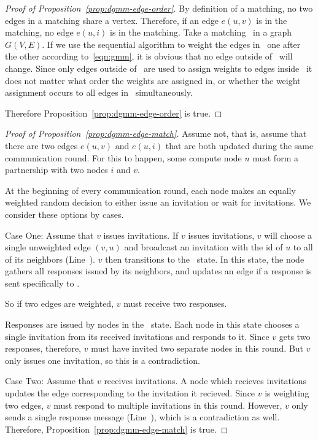   \begin{proof}[Proof of Proposition~\ref{prop:dgmm-edge-order}]
    By definition of a matching, no two edges in a matching share a vertex. Therefore, if an edge $e(u,v)$ is in the matching, no edge $e(u,i)$ is in the matching. 
    Take a matching \bMd\ in a graph $G(V,E)$. If we use the sequential algorithm to weight the edges in \bMd\ one after the other according to~\eqref{eqn:gmm}, it is obvious that no edge outside of \bMd\ will change. Since only edges outside of \bMd\ are used to assign weights to edges inside \bMd\, it does not matter what order the weights are assigned in, or whether the weight assignment occurs to all edges in \bMd\ simultaneously.
    
    Therefore Proposition~\ref{prop:dgmm-edge-order} is true.
  \end{proof}
  \begin{proof}[Proof of Proposition~\ref{prop:dgmm-edge-match}]
    Assume not, that is, assume that there are two edges $e(u,v) \text{ and } e(u,i)$ that are both updated during the same communication round. For this to happen, some compute node $u$ must form a partnership with two nodes $i$ and $v$. 
    
At the beginning of every communication round, each node makes an equally weighted random decision to either issue an invitation or wait for invitations. We consider these options by cases.

    Case One: Assume that $v$ issues invitations. If $v$ issues invitations, $v$ will choose a single unweighted edge $(v,u)$ and broadcast an invitation with the id of $u$ to all of its neighbors (Line~). $v$ then transitions to the \cWd\ state. In this state, the node gathers all responses issued by its neighbors, and updates an edge if a response is sent specifically to .

    So if two edges are weighted, $v$ must receive two responses.

    Responses are issued by nodes in the \cRd\ state. Each node in this state chooses a single invitation from its received invitations and responds to it. Since $v$ gets two responses, therefore, $v$ must have invited two separate nodes in this round. But $v$ only issues one invitation, so this is a contradiction.

    Case Two: Assume that $v$ receives invitations. A node which recieves invitations updates the edge corresponding to the invitation it recieved. Since $v$ is weighting two edges, $v$ must respond to multiple invitations in this round. However, $v$ only sends a single response message (Line~), which is a contradiction as well.
    Therefore, Proposition~\ref{prop:dgmm-edge-match} is true.
  \end{proof}
